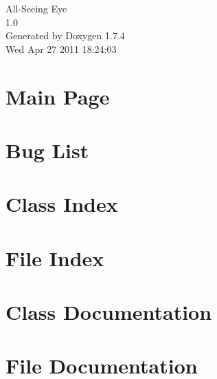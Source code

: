\documentclass[a4paper]{book}
\begin{document}
\hypersetup{pageanchor=false}
\begin{titlepage}
\vspace*{7cm}
\begin{center}
{\Large All-\/Seeing Eye \\[1ex]\large 1.0 }\\
\vspace*{1cm}
{\large Generated by Doxygen 1.7.4}\\
\vspace*{0.5cm}
{\small Wed Apr 27 2011 18:24:03}\\
\end{center}
\end{titlepage}
\clearemptydoublepage
{}
\tableofcontents
\clearemptydoublepage
{}
\hypersetup{pageanchor=true}
\chapter{Main Page}
\label{index}\hypertarget{index}{}
\chapter{Bug List}
\label{bug}
\hypertarget{bug}{}

\chapter{Class Index}

\chapter{File Index}

\chapter{Class Documentation}






\chapter{File Documentation}




\printindex
\end{document}
